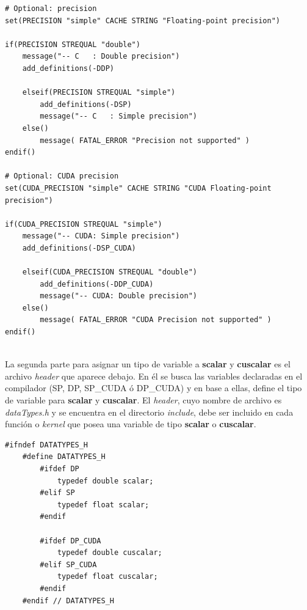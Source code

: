 \newpage
{\scriptsize
	\begin{frame}{}
		\begin{lstlisting}[frame=single]
# Optional: precision
set(PRECISION "simple" CACHE STRING "Floating-point precision")

if(PRECISION STREQUAL "double")
	message("-- C   : Double precision")
	add_definitions(-DDP)

	elseif(PRECISION STREQUAL "simple")
		add_definitions(-DSP)
		message("-- C   : Simple precision")
	else()
		message( FATAL_ERROR "Precision not supported" )
endif()

# Optional: CUDA precision
set(CUDA_PRECISION "simple" CACHE STRING "CUDA Floating-point precision")

if(CUDA_PRECISION STREQUAL "simple")
	message("-- CUDA: Simple precision")
	add_definitions(-DSP_CUDA)

	elseif(CUDA_PRECISION STREQUAL "double")
		add_definitions(-DDP_CUDA)
		message("-- CUDA: Double precision")
	else()
		message( FATAL_ERROR "CUDA Precision not supported" )
endif()
		
		\end{lstlisting}
		
	\end{frame}
}
La segunda parte para asignar un tipo de variable a \textbf{scalar} y \textbf{cuscalar} es el archivo \textit{header} que aparece debajo. En él se busca las variables declaradas en el compilador (SP, DP, SP\_CUDA ó DP\_CUDA) y en base a ellas, define el tipo de variable para \textbf{scalar} y \textbf{cuscalar}. El \textit{header}, cuyo nombre de archivo es \textit{dataTypes.h} y se encuentra en el directorio \textit{include}, debe ser incluido en cada función o \textit{kernel} que posea una variable de tipo  \textbf{scalar} o \textbf{cuscalar}.

{\footnotesize
	\begin{frame}{}
		\begin{lstlisting}[frame=single]
	#ifndef DATATYPES_H
	#define DATATYPES_H
		#ifdef DP
			typedef double scalar;
		#elif SP
			typedef float scalar;
		#endif	
		
		#ifdef DP_CUDA
			typedef double cuscalar;
		#elif SP_CUDA
			typedef float cuscalar;
		#endif
	#endif // DATATYPES_H
		
		\end{lstlisting}
		
	\end{frame}
}
\newpage

